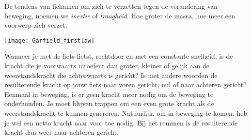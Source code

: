 \documentclass{ximera}
\begin{document}
	De tendens van lichamen om zich te verzetten tegen de verandering van beweging, noemen we \textit{inertie} of \textit{traagheid}. Hoe groter de massa, hoe meer een voorwerp zich verzet.
	
	\begin{image}
	\texttt{[image: Garfield\_firstlaw]}
	\end{image}
	
	\begin{example}
	Wanneer je met de fiets fietst, rechtdoor en met een constante snelheid, is de kracht die je voorwaarts uitoefent dan groter, kleiner of gelijk aan de weerstandskracht die achterwaarts is gericht? Is met andere woorden de resulterende kracht op jouw fiets naar voren gericht, nul of naar achteren gericht? 
	Eenmaal in beweging, is er geen kracht meer nodig om de beweging te onderhouden. Je moet blijven trappen om een even grote kracht als de weerstandskracht te kunnen genereren. Natuurlijk, om in beweging te komen, heb je wel een netto kracht naar voor toe nodig. Bij het remmen is de resulterende kracht dan weer naar achteren gericht.
	\end{example}
	
	
	
	
	
	
\end{document}

